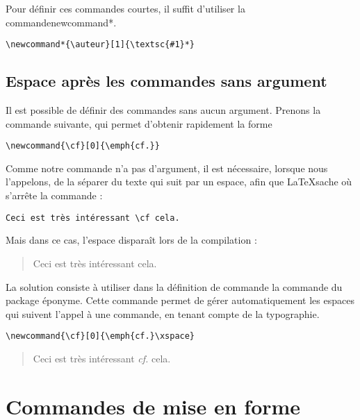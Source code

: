 Pour définir ces commandes courtes, il suffit d'utiliser la commande{newcommand*}.

\begin{verbatim}
\newcommand*{\auteur}[1]{\textsc{#1}*}
\end{verbatim}

\subsection{Espace après les commandes sans argument}


Il est possible de définir des commandes sans aucun argument. Prenons la commande suivante, qui permet d'obtenir rapidement la forme \forme{\cf}

\begin{verbatim}
\newcommand{\cf}[0]{\emph{cf.}}
\end{verbatim}

Comme notre commande n'a pas d'argument, il est nécessaire, lorsque nous l'appelons, de la séparer du texte qui suit par un espace, afin que \LaTeX sache où s'arrête la commande : 

\begin{verbatim}
Ceci est très intéressant \cf cela.
\end{verbatim}

Mais dans ce cas, l'espace disparaît lors de la compilation :

\begin{quotation}
Ceci est très intéressant \cf cela.
\end{quotation}

La solution consiste à utiliser dans la définition de commande la commande  du package éponyme. Cette commande permet de gérer automatiquement les espaces qui suivent l'appel à une commande, en tenant compte de la typographie.

\begin{verbatim}
\newcommand{\cf}[0]{\emph{cf.}\xspace}
\end{verbatim}

\renewcommand{\cf}[0]{\emph{cf.}\xspace}
\begin{quotation}
Ceci est très intéressant \cf cela.
\end{quotation}




\section{Commandes de mise en forme\label{mef}}

